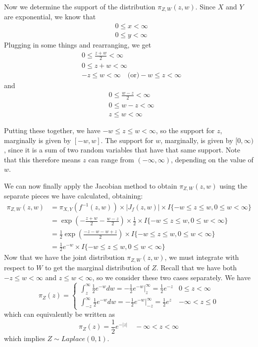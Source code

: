 \documentclass[
  letterpaper,
  DIV=11,
  numbers=noendperiod]{scrreprt}
\begin{document}
Now we determine the support of the distribution \(\pi_{Z,W} (z,w)\).
Since \(X\) and \(Y\) are exponential, we know that \begin{align*}
    & 0 \leq x < \infty \\
    & 0 \leq y < \infty
\end{align*} Plugging in some things and rearranging, we get
\begin{align*}
    & 0 \leq \frac{z + w}{2} < \infty \\
    & 0 \leq z + w < \infty \\
    & -z \leq w < \infty \quad \text{(or)} -w \leq z < \infty
\end{align*} and\\
\begin{align*}
    & 0 \leq \frac{w - z}{2} < \infty \\
    & 0 \leq w - z < \infty \\
    & z \leq w < \infty
\end{align*}

Putting these together, we have \(-w \leq z \leq w < \infty\), so the
support for \(z\), marginally is given by \([-w, w]\). The support for
\(w\), marginally, is given by \([0, \infty)\), since it is a sum of two
random variables that have that same support. Note that this therefore
means \(z\) can range from \((-\infty, \infty)\), depending on the value
of \(w\).

We can now finally apply the Jacobian method to obtain
\(\pi_{Z,W}(z,w)\) using the separate pieces we have calculated,
obtaining: \begin{align*}
    \pi_{Z,W}(z,w) & = \pi_{X,Y}(f^{-1}(z,w)) \times | J_f(z,w) |  \times I \{ -w \leq z \leq w, 0 \leq w < \infty \}\\
    & = \exp(-\frac{z + w}{2} - \frac{w-z}{2}) \times \frac{1}{2} \times I \{ -w \leq z \leq w, 0 \leq w < \infty \}\\
    & = \frac{1}{2} \exp(\frac{-z - w - w + z}{2}) \times I \{ -w \leq z \leq w, 0 \leq w < \infty \}\\
    & = \frac{1}{2} e^{-w} \times I \{ -w \leq z \leq w, 0 \leq w < \infty \}
\end{align*} Now that we have the joint distribution \(\pi_{Z,W}(z,w)\),
we must integrate with respect to \(W\) to get the marginal distribution
of \(Z\). Recall that we have both \(-z \leq w < \infty\) and
\(z \leq w < \infty\), so we consider these two cases separately. We
have \[
\pi_Z(z) = \begin{cases}
    \int_z^\infty \frac{1}{2} e^{-w} dw = - \frac{1}{2} e^{-w} \big|_z^\infty = \frac{1}{2}e^{-z} & 0 \leq z < \infty\\
    \int_{-z}^\infty \frac{1}{2} e^{-w} dw = - \frac{1}{2} e^{-w} \big|_{-z}^\infty = \frac{1}{2}e^{z} & -\infty < z \leq 0
\end{cases}
\] which can equivalently be written as \[
\pi_Z(z) = \frac{1}{2} e^{-|z|} \quad -\infty < z < \infty
\] which implies \(Z \sim Laplace(0,1)\).
\end{document}
